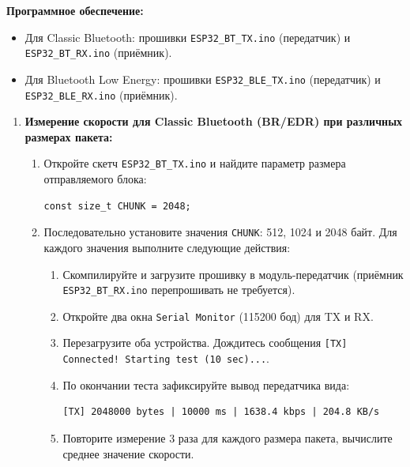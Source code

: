\textbf{Программное обеспечение:}
\begin{itemize}[nosep]
    \item Для Classic Bluetooth: прошивки \texttt{ESP32\_BT\_TX.ino} (передатчик) и \texttt{ESP32\_BT\_RX.ino} (приёмник).
    \item Для Bluetooth Low Energy: прошивки \texttt{ESP32\_BLE\_TX.ino} (передатчик) и \texttt{ESP32\_BLE\_RX.ino} (приёмник).
\end{itemize}

\begin{enumerate}[nosep, leftmargin=*]
    \item \textbf{Измерение скорости для Classic Bluetooth (BR/EDR) при различных размерах пакета:}
    \begin{enumerate}[label=\alph*), nosep]
        \item Откройте скетч \texttt{ESP32\_BT\_TX.ino} и найдите параметр размера отправляемого блока:
        \begin{lstlisting}
const size_t CHUNK = 2048;
        \end{lstlisting}
        \item Последовательно установите значения \texttt{CHUNK}: 512, 1024 и 2048 байт. Для каждого значения выполните следующие действия:
        \begin{enumerate}[label=\roman*), nosep]
            \item Скомпилируйте и загрузите прошивку в модуль-передатчик (приёмник \texttt{ESP32\_BT\_RX.ino} перепрошивать не требуется).
            \item Откройте два окна \texttt{Serial Monitor} (115200 бод) для TX и RX.
            \item Перезагрузите оба устройства. Дождитесь сообщения \texttt{[TX] Connected! Starting test (10 sec)...}.
            \item По окончании теста зафиксируйте вывод передатчика вида:
            \begin{lstlisting}
[TX] 2048000 bytes | 10000 ms | 1638.4 kbps | 204.8 KB/s
            \end{lstlisting}
            \item Повторите измерение 3 раза для каждого размера пакета, вычислите среднее значение скорости.
        \end{enumerate}
    \end{enumerate}


\end{enumerate}
